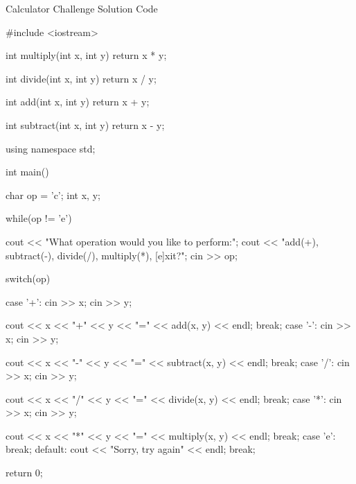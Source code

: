 \documentclass[../lecture1-variables.tex]{subfiles}
\begin{document}
\begin{frame}[fragile]{Calculator Challenge Solution Code}
    \begin{cppcode}[]
#include <iostream>

int multiply(int x, int y)
{
    return x * y;
}

int divide(int x, int y)
{
    return x / y;
}

int add(int x, int y)
{
    return x + y;
}

int subtract(int x, int y)
{
    return x - y;
}

using namespace std;

int main()
{
    char op = 'c';
    int x, y;

    while(op != 'e')
    {
        cout << "What operation would you like to perform:";
        cout << "add(+), subtract(-), divide(/), multiply(*), [e]xit?";
        cin >> op;

        switch(op)
        {
            case '+':
                cin >> x;
                cin >> y;

                cout << x << "+" << y << "=" << add(x, y) << endl;
                break;
            case '-':
                cin >> x;
                cin >> y;

                cout << x << "-" << y << "=" << subtract(x, y) << endl;
                break;
            case '/':
                cin >> x;
                cin >> y;

                cout << x << "/" << y << "=" << divide(x, y) << endl;
                break;
            case '*':
                cin >> x;
                cin >> y;

                cout << x << "*" << y << "=" << multiply(x, y) << endl;
                break;
            case 'e':
                break;
            default:
                cout << "Sorry, try again" << endl;
                break;
        }
    }

    return 0;
}
    \end{cppcode}
\end{frame}

\end{document}
